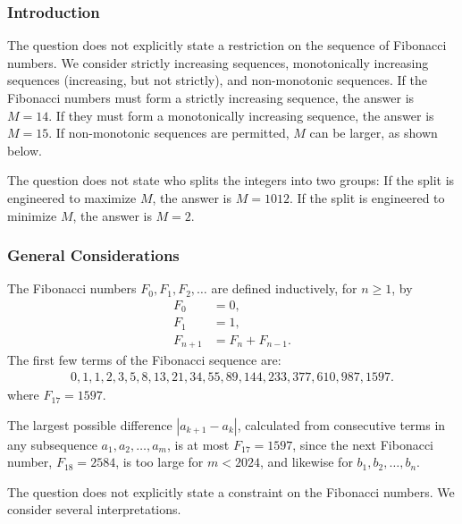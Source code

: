 
\subsubsection*{Introduction}

The question does not explicitly state a restriction on the sequence of Fibonacci numbers. We consider strictly increasing sequences, monotonically increasing sequences (increasing, but not strictly), and non-monotonic sequences. If the Fibonacci numbers must form a strictly increasing sequence, the answer is $M=14$. If they must form a monotonically increasing sequence, the answer is $M=15$. If non-monotonic sequences are permitted, $M$ can be larger, as shown below. 

The question does not state who splits the integers into two groups: If the split is engineered to maximize $M$, the answer is $M=1012$. If the split is engineered to minimize $M$, the answer is $M=2$. 

\subsubsection*{General Considerations}

The Fibonacci numbers $F_{0},F_{1},F_{2},\ldots$ are defined inductively, for $n \ge 1$, by 
\begin{align*}
F_{0} & = 0, \\
F_{1} & = 1, \\ 
F_{n+1} & = F_{n} + F_{n-1}.
\end{align*}
The first few terms of the Fibonacci sequence are:
\begin{align*}
0, 1, 1, 2, 3, 5, 8, 13, 21, 34, 55, 89, 144, 233, 377, 610, 987, 1597.
\end{align*}
where $F_{17}=1597$.

The largest possible difference $|a_{k+1}-a_{k}|$, calculated from consecutive terms in any subsequence $a_{1},a_{2},\ldots,a_{m}$, is at most $F_{17}=1597$, since the next Fibonacci number, $F_{18}=2584$, is too large for $m<2024$, and likewise for $b_{1},b_{2},\ldots,b_{n}$. 

The question does not explicitly state a constraint on the Fibonacci numbers. We consider several interpretations. 


